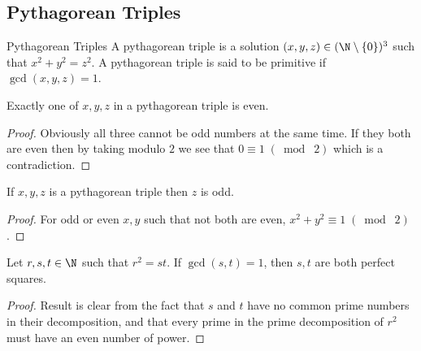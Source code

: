 \documentclass[a4paper]{article}
\begin{document}
\subsection{Pythagorean Triples}
\begin{defn}{Pythagorean Triples}{} A pythagorean triple is a solution $(x,y,z)\in(\N\setminus\{0\})^3$ such that $x^2+y^2=z^2$. A pythagorean triple is said to be primitive if $\gcd(x,y,z)=1$. 
\end{defn}

\begin{lmm}{}{} Exactly one of $x,y,z$ in a pythagorean triple is even. \tcbline
\begin{proof}
Obviously all three cannot be odd numbers at the same time. If they both are even then by taking modulo $2$ we see that $0\equiv 1\;(\bmod\;2)$ which is a contradiction. 
\end{proof}
\end{lmm}

\begin{lmm}{}{} If $x,y,z$ is a pythagorean triple then $z$ is odd. \tcbline
\begin{proof}
For odd or even $x,y$ such that not both are even, $x^2+y^2\equiv 1\;(\bmod\;2)$. 
\end{proof}
\end{lmm}

\begin{lmm}{}{} Let $r,s,t\in\N$ such that $r^2=st$. If $\gcd(s,t)=1$, then $s,t$ are both perfect squares. \tcbline
\begin{proof}
Result is clear from the fact that $s$ and $t$ have no common prime numbers in their decomposition, and that every prime in the prime decomposition of $r^2$ must have an even number of power. 
\end{proof}
\end{lmm}
\end{document}
